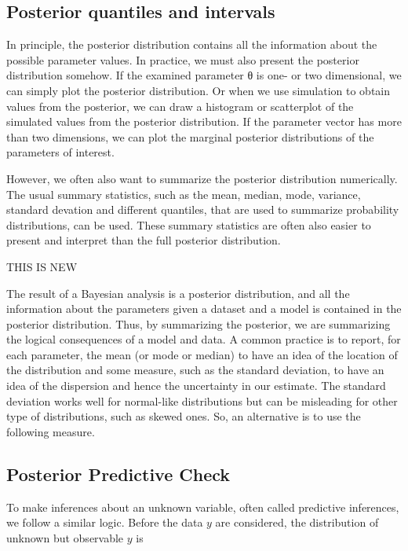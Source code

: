\subsection{Posterior quantiles and intervals}







In principle, the posterior distribution contains all the information about the possible parameter values. In practice, we must also present the posterior distribution somehow. If the examined parameter  
θ
  is one- or two dimensional, we can simply plot the posterior distribution. Or when we use simulation to obtain values from the posterior, we can draw a histogram or scatterplot of the simulated values from the posterior distribution. If the parameter vector has more than two dimensions, we can plot the marginal posterior distributions of the parameters of interest.

However, we often also want to summarize the posterior distribution numerically. The usual summary statistics, such as the mean, median, mode, variance, standard devation and different quantiles, that are used to summarize probability distributions, can be used. These summary statistics are often also easier to present and interpret than the full posterior distribution.

THIS IS NEW

The result of a Bayesian analysis is a posterior distribution, and all the information about the parameters given a dataset and a model is contained in the posterior distribution. Thus, by summarizing the posterior, we are summarizing the logical consequences of a model and data. A common practice is to report, for each parameter, the mean (or mode or median) to have an idea of the location of the distribution and some measure, such as the standard deviation, to have an idea of the dispersion and hence the uncertainty in our estimate. The standard deviation works well for normal-like distributions but can be misleading for other type of distributions, such as skewed ones. So, an alternative is to use the following measure.

\subsection{Posterior Predictive Check}

To make inferences about an unknown variable, often called predictive inferences, we follow a similar logic. Before the data $y$ are considered, the distribution of unknown but observable $y$ is 


